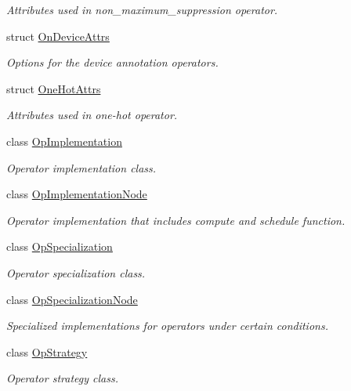 \begin{DoxyCompactItemize}
\begin{DoxyCompactList}\small\item\em Attributes used in non\+\_\+maximum\+\_\+suppression operator. \end{DoxyCompactList}\item 
struct \hyperlink{structtvm_1_1relay_1_1OnDeviceAttrs}{On\+Device\+Attrs}
\begin{DoxyCompactList}\small\item\em Options for the device annotation operators. \end{DoxyCompactList}\item 
struct \hyperlink{structtvm_1_1relay_1_1OneHotAttrs}{One\+Hot\+Attrs}
\begin{DoxyCompactList}\small\item\em Attributes used in one-\/hot operator. \end{DoxyCompactList}\item 
class \hyperlink{classtvm_1_1relay_1_1OpImplementation}{Op\+Implementation}
\begin{DoxyCompactList}\small\item\em Operator implementation class. \end{DoxyCompactList}\item 
class \hyperlink{classtvm_1_1relay_1_1OpImplementationNode}{Op\+Implementation\+Node}
\begin{DoxyCompactList}\small\item\em Operator implementation that includes compute and schedule function. \end{DoxyCompactList}\item 
class \hyperlink{classtvm_1_1relay_1_1OpSpecialization}{Op\+Specialization}
\begin{DoxyCompactList}\small\item\em Operator specialization class. \end{DoxyCompactList}\item 
class \hyperlink{classtvm_1_1relay_1_1OpSpecializationNode}{Op\+Specialization\+Node}
\begin{DoxyCompactList}\small\item\em Specialized implementations for operators under certain conditions. \end{DoxyCompactList}\item 
class \hyperlink{classtvm_1_1relay_1_1OpStrategy}{Op\+Strategy}
\begin{DoxyCompactList}\small\item\em Operator strategy class. \end{DoxyCompactList}\item 

\end{DoxyCompactItemize}
